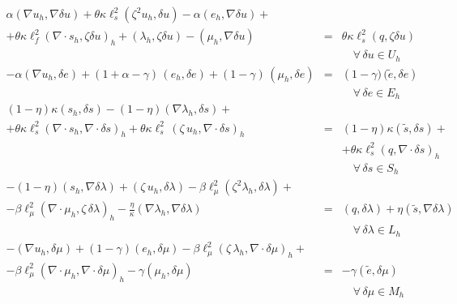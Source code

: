 \documentclass{article}
\begin{document}
\begin{eqnarray}
\alpha \left ( \nabla u_h, \nabla \delta u \right ) + \theta \kappa \ell_s^2  \left ( \zeta^2 u_h, \delta u \right ) - \alpha \left ( e_h,\nabla \delta u \right ) +& & \nonumber \\
 + \theta \kappa \ell_f^2  \left ( \nabla \cdot s_h, \zeta \delta u \right )_h + \left ( \lambda_h, \zeta\delta u \right ) - \left ( \mu_h, \nabla \delta u \right ) & = & \theta \kappa \ell_s^2  \left ( q, \zeta\delta u \right )\nonumber \\ & & \quad \forall \,\delta u\in U_h  \label{eq:var1h}\\
-\alpha \left ( \nabla u_h, \delta e \right ) +(1+\alpha-\gamma)\,\left ( e_h,\delta e \right )+ (1-\gamma)\, \left ( \mu_h, \delta e \right ) &=& \left (1-\gamma)\,( \tilde{e},\delta e \right )  \nonumber \\ & &\quad \forall \,\delta e \in E_h\label{eq:var2h}\\
(1-\eta)\kappa \left ( s_h, \delta s \right ) - (1-\eta)\left ( \nabla \lambda_h, \delta s \right ) + & & \nonumber \\
+\theta \kappa \ell_s^2  \left ( \nabla \cdot s_h, \nabla \cdot \delta s \right )_h+ \theta \kappa \ell_s^2 \,\left (\zeta\,u_h, \nabla \cdot \delta s \right )_h & = & (1-\eta)\kappa \left ( \tilde{s},\delta s \right ) + \nonumber \\ & &+\theta \kappa \ell_s^2  \left ( q , \nabla \cdot \delta s \right )_h \nonumber \\ & & \quad \forall\, \delta s \in S_h \label{eq:var3h}\\
-(1-\eta)\left ( s_h,\nabla \delta \lambda\right ) + \left ( \zeta\,u_h,\delta \lambda \right ) - \beta \ell_{\mu}^2 \left ( \zeta^2 \lambda_h, \delta \lambda\right )+ & & \nonumber \\
- \beta \ell_{\mu}^2 \left ( \nabla \cdot \mu_h, \zeta\,\delta \lambda\right )_h -\frac{\eta}{\kappa} \left ( \nabla \lambda_h , \nabla \delta \lambda \right )&=&\left ( q,\delta \lambda \right ) + \eta \left ( \tilde{s},\nabla \delta \lambda \right ) \nonumber \\ & & \quad \forall\,\delta \lambda \in L_h\label{eq:var4h}\\
-\left (\nabla u_h,\delta \mu \right )+(1-\gamma)\left ( e_h,\delta \mu \right )
- \beta \ell_{\mu}^2 \left ( \zeta\,\lambda_h, \nabla \cdot \delta \mu \right )_h + & & \nonumber \\- \beta \ell_{\mu}^2 \left ( \nabla \cdot \mu_h, \nabla \cdot \delta \mu \right )_h - \gamma \left ( \mu_h,\delta \mu \right ) & = & -\gamma \left (\tilde{e},\delta \mu \right ) \nonumber \\ & & \quad \forall\,\delta \mu \in M_h \label{eq:var5h}
\end{eqnarray}
\end{document}
